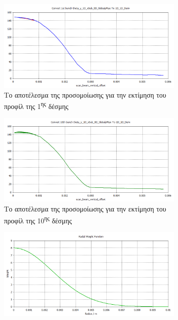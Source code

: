 \begin{figure}[tph]	
	\begin{subfigure}{0.8\textwidth}
		\includegraphics[width=\linewidth]{figures/CST-EBS-implementation/CST-EBS-1st-bunch-thetay}
		\centering
		\caption{Το αποτέλεσμα της προσομοίωσης για την εκτίμηση του προφίλ της 1\textsuperscript{ης} δέσμης}
		\label{fig:CST-EBS-1st-bunch-thetay}
	\end{subfigure}
	\hfill
	\begin{subfigure}{0.8\textwidth}
		\includegraphics[width=\linewidth]{figures/CST-EBS-implementation/CST-EBS-10th-bunch-thetay}
		\centering
		\caption{Το αποτέλεσμα της προσομοίωσης για την εκτίμηση του προφίλ της 10\textsuperscript{ης} δέσμης}
		\label{fig:CST-EBS-10th-bunch-thetay}
	\end{subfigure}
	\par\bigskip
	\begin{subfigure}{0.8\textwidth}
		\includegraphics[width=\linewidth]{figures/CST-EBS-implementation/CST-EBS-actual-weight-function}

\end{subfigure}
\end{figure}
